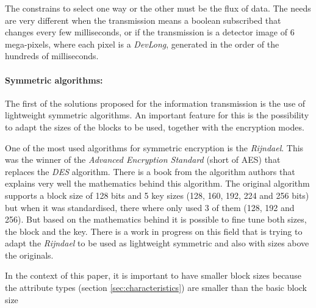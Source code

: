 \documentclass[10pt,a4paper,twoside]{llncs}
\begin{document}
The constrains to select one way or the other must be the flux of data. The needs are very different when the transmission means a boolean subscribed that changes every few milliseconds, or if the transmission is a detector image of 6 mega-pixels, where each pixel is a \emph{DevLong}, generated in the order of the hundreds of milliseconds.

\paragraph{Symmetric algorithms:} The first of the solutions proposed for the information transmission is the use of lightweight symmetric algorithms. An important feature for this is the possibility to adapt the sizes of the blocks to be used, together with the encryption modes.

One of the most used algorithms for symmetric encryption is the \emph{Rijndael}. This was the winner of the \emph{Advanced Encryption Standard} (short of AES) \cite{AES-FIPS} that replaces the \emph{DES} algorithm. There is a book \cite{Daemen:2002:DR:560131} from the algorithm authors that explains very well the mathematics behind this algorithm. The original algorithm supports a block size of 128 bits and 5 key sizes (128, 160, 192, 224 and 256 bits) but when it was standardised, there where only used 3 of them (128, 192 and 256). But based on the mathematics behind it is possible to fine tune both sizes, the block and the key. There is a work in progress on this field \cite{gRijndael} that is trying to adapt the \emph{Rijndael} to be used as lightweight symmetric and also with sizes above the originals.

In the context of this paper, it is important to have smaller block sizes because the attribute types (section \ref{sec:characteristics}) are smaller than the basic block size
\end{document}
